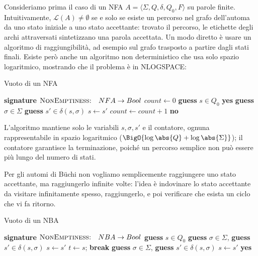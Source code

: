 Consideriamo prima il caso di un NFA \(A = \langle \Sigma,Q,\delta,Q_0,F\rangle\) su parole finite. Intuitivamente, \(\mathcal{L}(A) \neq \emptyset\) se e solo se esiste un percorso nel grafo dell'automa da uno stato iniziale a uno stato accettante: trovato il percorso, le etichette degli archi attraversati sintetizzano una parola accettata. Un modo diretto è usare un algoritmo di raggiungibilità, ad esempio sul grafo trasposto a partire dagli stati finali. Esiste però anche un algoritmo non deterministico che usa solo spazio logaritmico, mostrando che il problema è in NLOGSPACE\@:

\begin{algorithmdesc}{Vuoto di un NFA}
  \begin{algorithmic}[1]
    \Statex{} \textbf{signature} \(\textsc{NonEmptiness:} \quad NFA \to Bool\)
    \State{} \(count \gets 0\)
    \State{} \textbf{guess} \(s \in Q_0\)
    \Loop{}
    \State{} \Return{} \textbf{yes}
    \State{} \textbf{guess} \(\sigma \in \Sigma\)
    \State{} \textbf{guess} \(s' \in \delta(s,\sigma)\)
    \State{} \(s \gets s'\)
    \State{} \(count \gets count + 1\)
    \Else{}
    \State{} \Return{} \textbf{no}
    \EndIf{}
    \EndLoop{}
    \EndFunction{}
  \end{algorithmic}
\end{algorithmdesc}

L'algoritmo mantiene solo le variabili \(s, \sigma, s'\) e il contatore, ognuna rappresentabile in spazio logaritmico (\(\BigO{\log\abs{Q} + \log\abs{\Sigma}}\)); il contatore garantisce la terminazione, poiché un percorso semplice non può essere più lungo del numero di stati.

Per gli automi di Büchi non vogliamo semplicemente raggiungere uno stato accettante, ma raggiungerlo infinite volte: l'idea è indovinare lo stato accettante da visitare infinitamente spesso, raggiungerlo, e poi verificare che esista un ciclo che vi fa ritorno.

\begin{algorithmdesc}{Vuoto di un NBA}
  \begin{algorithmic}[1]
    \Statex{} \textbf{signature} \(\textsc{NonEmptiness:} \quad NBA \to Bool\)
    \State{} \textbf{guess} \(s \in Q_0\)
    \Loop{} 
    \State{} \textbf{guess} \(\sigma \in \Sigma\), \textbf{guess} \(s' \in \delta(s,\sigma)\)
    \State{} \(s \gets s'\)
    \State{} \(t \gets s\); \textbf{break}
    \EndIf{}
    \EndLoop{}
    \Loop{} 
    \State{} \textbf{guess} \(\sigma \in \Sigma\), \textbf{guess} \(s' \in \delta(s,\sigma)\)
    \State{} \(s \gets s'\)
    \State{} \Return{} \textbf{yes}
    \EndIf{}
    \EndLoop{}
    \EndFunction{}
  \end{algorithmic}
\end{algorithmdesc}

